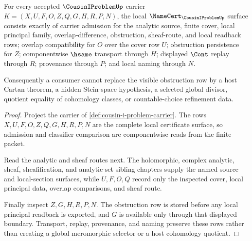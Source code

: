 \begin{theorem}
\label{thm:cousin-i-problem-namecert-obligations}
For every accepted $\CousinIProblemUp$ carrier $K=(X,U,F,O,Z,Q,G,H,R,P,N)$, the local $\NameCert_{\CousinIProblemUp}$ surface consists exactly of carrier admission for the analytic source, finite cover, local principal family, overlap-difference, obstruction, sheaf-route, and local readback rows; overlap compatibility for $O$ over the cover row $U$; obstruction persistence for $Z$; componentwise $\hsame$ transport through $H$; displayed $\Cont$ replay through $R$; provenance through $P$; and local naming through $N$.

Consequently a consumer cannot replace the visible obstruction row by a host Cartan theorem, a hidden Stein-space hypothesis, a selected global divisor, quotient equality of cohomology classes, or countable-choice refinement data.
\end{theorem}
\begin{proof}
Project the carrier of \autoref{def:cousin-i-problem-carrier}. The rows $X,U,F,O,Z,Q,G,H,R,P,N$ are the complete local certificate surface, so admission and classifier comparison are componentwise reads from the finite packet.

Read the analytic and sheaf routes next. The holomorphic, complex analytic, sheaf, sheafification, and analytic-set sibling chapters supply the named source and local-section surfaces, while $U,F,O,Q$ record only the inspected cover, local principal data, overlap comparisons, and sheaf route.

Finally inspect $Z,G,H,R,P,N$. The obstruction row is stored before any local principal readback is exported, and $G$ is available only through that displayed boundary. Transport, replay, provenance, and naming preserve these rows rather than creating a global meromorphic selector or a host cohomology quotient.
\end{proof}

